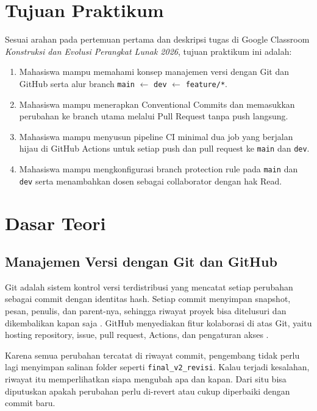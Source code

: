 \documentclass[a4paper,oneside,12pt]{report}
\begin{document}
\setcounter{page}{3}

\chapter[Tujuan Praktikum]{Tujuan Praktikum}
Sesuai arahan pada pertemuan pertama dan deskripsi tugas di Google Classroom \textit{Konstruksi dan Evolusi Perangkat Lunak 2026}, tujuan praktikum ini adalah:
\begin{enumerate}
   \item Mahasiswa mampu memahami konsep manajemen versi dengan Git dan GitHub serta alur branch \texttt{main} $\leftarrow$ \texttt{dev} $\leftarrow$ \texttt{feature/*}.
   \item Mahasiswa mampu menerapkan Conventional Commits dan memasukkan perubahan ke branch utama melalui Pull Request tanpa push langsung.
   \item Mahasiswa mampu menyusun pipeline CI minimal dua job yang berjalan hijau di GitHub Actions untuk setiap push dan pull request ke \texttt{main} dan \texttt{dev}.
   \item Mahasiswa mampu mengkonfigurasi branch protection rule pada \texttt{main} dan \texttt{dev} serta menambahkan dosen sebagai collaborator dengan hak Read.
\end{enumerate}

\clearpage

\chapter{Dasar Teori}

\section{Manajemen Versi dengan Git dan GitHub}
Git adalah sistem kontrol versi terdistribusi yang mencatat setiap perubahan sebagai commit dengan identitas hash. Setiap commit menyimpan snapshot, pesan, penulis, dan parent-nya, sehingga riwayat proyek bisa ditelusuri dan dikembalikan kapan saja \cite{progit,chacon2024}. GitHub menyediakan fitur kolaborasi di atas Git, yaitu hosting repository, issue, pull request, Actions, dan pengaturan akses \cite{github-docs,github-branches}.

Karena semua perubahan tercatat di riwayat commit, pengembang tidak perlu lagi menyimpan salinan folder seperti \texttt{final\_v2\_revisi}. Kalau terjadi kesalahan, riwayat itu memperlihatkan siapa mengubah apa dan kapan. Dari situ bisa diputuskan apakah perubahan perlu di-revert atau cukup diperbaiki dengan commit baru.
\end{document}
